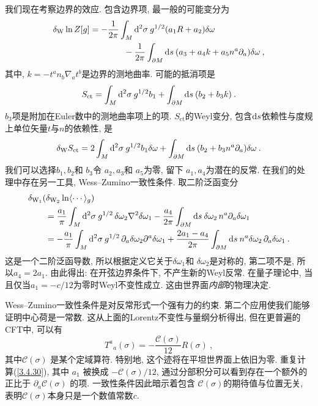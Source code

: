 我们现在考察边界的效应. 包含边界项, 最一般的可能变分为
\begin{align}
\delta_{\mathrm{W}} \ln Z[g] &=-\frac{1}{2 \pi} \int_{M} \mathrm{d}^{2} \sigma\: g^{1 / 2} (a_{1} R+a_{2}) \delta \omega  \nonumber \\
&\qquad \qquad -\frac{1}{2 \pi} \int_{\partial M} \mathrm{d} s\: (a_{3}+a_{4} k+a_{5} n^{a} \partial_{a}) \delta \omega \:, \label{3.4.27}
\end{align}
其中, $k=-t^{a} n_{b} \nabla_{a} t^{b}$是边界的测地曲率. 可能的抵消项是
\begin{equation}
	S_{\mathrm{ct}}=\int_{M} \mathrm{d}^{2} \sigma \: g^{1 / 2} b_{1}+\int_{\partial M} \mathrm{d} s\: (b_{2}+b_{3} k) \:. \label{3.4.28}
\end{equation}
$b_3$项是附加在Euler数中的测地曲率项上的项. $S_{\mathrm{ct}}$的Weyl变分, 包含$\mathrm{d} s$依赖性与度规上单位矢量$t$与$n$的依赖性, 是
\begin{equation}
	\delta_{\mathrm{W}} S_{\mathrm{ct}}=2 \int_{M} \mathrm{d}^{2} \sigma \: g^{1 / 2} b_{1} \delta \omega + 
	\int_{\partial M} \mathrm{d} s\: (b_{2}+b_{3} n^{a} \partial_{a}) \delta \omega \:. \label{3.4.29}
\end{equation}
我们可以选择$b_{1}, b_{2}$和 $b_{3}$令 $a_{2}, a_{3}$和 $a_{5}$为零, 留下 $a_{1}, a_{4}$为潜在的反常. 在我们的处理中存在另一工具, Wess–Zumino一致性条件. 
取二阶泛函变分
	\begin{align}
		&\delta_{\mathrm{W}_{1}}(\delta_{\mathrm{W}_{2}} \ln \langle\cdots\rangle_{g}) \nonumber \\
		 &\qquad=\frac{a_{1}}{\pi} \int_{M} \mathrm{d}^{2} \sigma\: g^{1 / 2}\, \delta \omega_{2} \nabla^{2} \delta \omega_{1}-\frac{a_{4}}{2 \pi} \int_{\partial M} \mathrm{d} s\: \delta \omega_{2} \, n^{a} \partial_{a} \delta \omega_{1} \nonumber \\
		&\qquad=-\frac{a_{1}}{\pi} \int_{M} \mathrm{d}^{2} \sigma\: g^{1 / 2} \,\partial_{a} \delta \omega_{2} \partial^{a} \delta \omega_{1}+\frac{2 a_{1}-a_{4}}{2 \pi} \int_{\partial M} \mathrm{d} s\: n^{a} \delta \omega_{2}\, \partial_{a} \delta \omega_{1} \:. \label{3.4.30}
	\end{align}
这是一个二阶泛函导数, 所以根据定义它关于$\delta \omega_{1}$和 $\delta \omega_{2}$是对称的, 第二项不是, 所以$a_4=2a_1$. 由此得出: 在开弦边界条件下, 不产生新的Weyl反常. 在量子理论中, 当且仅当$a_{1}=-c / 12$为零时Weyl不变性成立. 这由世界面\emph{内部}的物理决定. 

Wess–Zumino一致性条件是对反常形式一个强有力的约束. 第二个应用使我们能够证明中心荷是一常数. 这从上面的Lorentz不变性与量纲分析得出, 但在更普遍的CFT中, 可以有
\begin{equation}
T^{a}{}_{a}(\sigma)=-\frac{\mathscr{C}(\sigma)}{12} R(\sigma) \:, \label{3.4.31}
\end{equation}
其中$\mathscr{C}(\sigma)$ 是某个定域算符. 特别地, 这个迹将在平坦世界面上依旧为零. 重复计算(\ref{3.4.30}), 其中 $a_{1}$ 被换成 $-\mathscr{C}(\sigma) / 12$, 通过分部积分可以看到存在一个额外的正比于 $\partial_{a} \mathscr{C}(\sigma)$ 的项. 一致性条件因此暗示着包含 $\mathscr{C}(\sigma)$的期待值与位置无关, 表明$\mathscr{C}(\sigma)$本身只是一个数值常数$c$.

